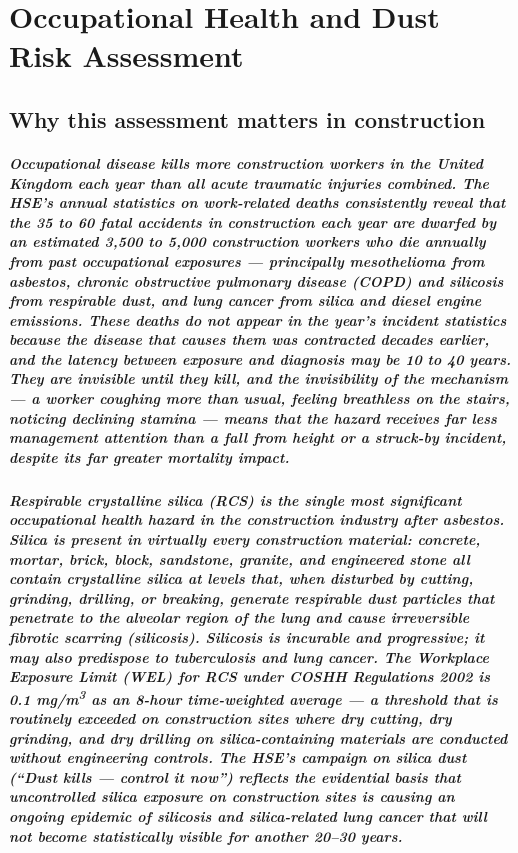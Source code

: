 \chapter{Occupational Health and Dust Risk Assessment}
\label{chap:Occupational Health and Dust Risk Assessment}

\section{Why this assessment matters in construction}

\paragraph{Occupational disease kills more construction workers in the United Kingdom each year than all acute traumatic injuries combined. The HSE's annual statistics on work-related deaths consistently reveal that the 35 to 60 fatal accidents in construction each year are dwarfed by an estimated 3,500 to 5,000 construction workers who die annually from past occupational exposures --- principally mesothelioma from asbestos, chronic obstructive pulmonary disease (COPD) and silicosis from respirable dust, and lung cancer from silica and diesel engine emissions. These deaths do not appear in the year's incident statistics because the disease that causes them was contracted decades earlier, and the latency between exposure and diagnosis may be 10 to 40 years. They are invisible until they kill, and the invisibility of the mechanism --- a worker coughing more than usual, feeling breathless on the stairs, noticing declining stamina --- means that the hazard receives far less management attention than a fall from height or a struck-by incident, despite its far greater mortality impact.}

\paragraph{Respirable crystalline silica (RCS) is the single most significant occupational health hazard in the construction industry after asbestos. Silica is present in virtually every construction material: concrete, mortar, brick, block, sandstone, granite, and engineered stone all contain crystalline silica at levels that, when disturbed by cutting, grinding, drilling, or breaking, generate respirable dust particles that penetrate to the alveolar region of the lung and cause irreversible fibrotic scarring (silicosis). Silicosis is incurable and progressive; it may also predispose to tuberculosis and lung cancer. The Workplace Exposure Limit (WEL) for RCS under COSHH Regulations 2002 is 0.1 mg/m\textsuperscript{3} as an 8-hour time-weighted average --- a threshold that is routinely exceeded on construction sites where dry cutting, dry grinding, and dry drilling on silica-containing materials are conducted without engineering controls. The HSE's campaign on silica dust (``Dust kills --- control it now'') reflects the evidential basis that uncontrolled silica exposure on construction sites is causing an ongoing epidemic of silicosis and silica-related lung cancer that will not become statistically visible for another 20--30 years.}

